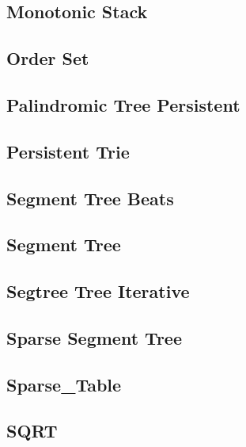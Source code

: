 ﻿\documentclass[10pt,twocolumn]{article}
\newcommand{\codefile}[1]{}}
\begin{document}
\subsection{Monotonic Stack}
\codefile{Data Structure/Monotonic Stack.cpp}

\subsection{Order Set}
\codefile{Data Structure/Order Set.cpp}

\subsection{Palindromic Tree Persistent}
\codefile{Data Structure/Palindromic Tree Persistent.cpp}

\subsection{Persistent Trie}
\codefile{Data Structure/Persistent Trie.cpp}

\subsection{Segment Tree Beats}
\codefile{Data Structure/Segment Tree Beats.cpp}

\subsection{Segment Tree}
\codefile{Data Structure/Segment Tree.cpp}

\subsection{Segtree Tree Iterative}
\codefile{Data Structure/Segtree Tree Iterative.cpp}

\subsection{Sparse Segment Tree}
\codefile{Data Structure/Sparse Segment Tree.cpp}

\subsection{Sparse\_Table}
\codefile{Data Structure/Sparse_Table.cpp}

\subsection{SQRT}
\codefile{Data Structure/SQRT.cpp}
\end{document}
